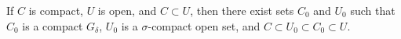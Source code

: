 If $C$ is compact, $U$ is open, and $C \subset U$, then there exist sets $C_0$ and $U_0$ such that $C_0$ is a compact $G_{\delta}$, $U_0$ is a $\sigma$-compact open set, and $C \subset U_0 \subset C_0 \subset U$.

